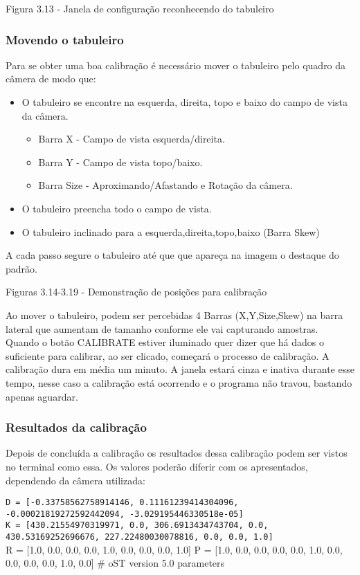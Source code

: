 Figura 3.13 - Janela de configuração reconhecendo do tabuleiro

\subsubsection{Movendo o tabuleiro}

Para se obter uma boa calibração é necessário mover o tabuleiro pelo quadro da câmera de modo que:

\begin{itemize}
	\item{O tabuleiro se encontre na esquerda, direita, topo e baixo do campo de vista da câmera.}
	\begin{itemize}
		\item{Barra X - Campo de vista esquerda/direita.}
		\item{Barra Y - Campo de vista topo/baixo.}
		\item{Barra Size - Aproximando/Afastando e Rotação da câmera.}
	\end{itemize}
	\item{O tabuleiro preencha todo o campo de vista.}
	\item{O tabuleiro inclinado para a esquerda,direita,topo,baixo (Barra Skew)}
\end{itemize}

A cada passo segure o tabuleiro até que que apareça na imagem o destaque do padrão.

Figuras 3.14-3.19 - Demonstração de posições para calibração

Ao mover o tabuleiro, podem ser percebidas 4 Barras (X,Y,Size,Skew) na barra lateral que aumentam de tamanho conforme ele vai capturando amostras. Quando o botão CALIBRATE estiver iluminado quer dizer que há dados o suficiente para calibrar, ao ser clicado, começará o processo de calibração.
A calibração dura em média um minuto. A janela estará cinza e inativa durante esse tempo, nesse caso a calibração está ocorrendo e o programa não travou, bastando apenas aguardar.

\subsubsection{Resultados da calibração}

Depois de concluída a calibração os resultados dessa calibração podem ser vistos no terminal como essa. Os valores poderão diferir com os apresentados, dependendo da câmera utilizada:


\texttt{D = {[}-0.33758562758914146, 0.11161239414304096, -0.00021819272592442094, -3.029195446330518e-05{]}\\
K = {[}430.21554970319971, 0.0, 306.6913434743704, 0.0, 430.53169252696676, 227.22480030078816, 0.0, 0.0, 1.0{]}}\\
R = {[}1.0, 0.0, 0.0, 0.0, 1.0, 0.0, 0.0, 0.0, 1.0{]}
P = {[}1.0, 0.0, 0.0, 0.0, 0.0, 1.0, 0.0, 0.0, 0.0, 0.0, 1.0, 0.0{]}
\# oST version 5.0 parameters

